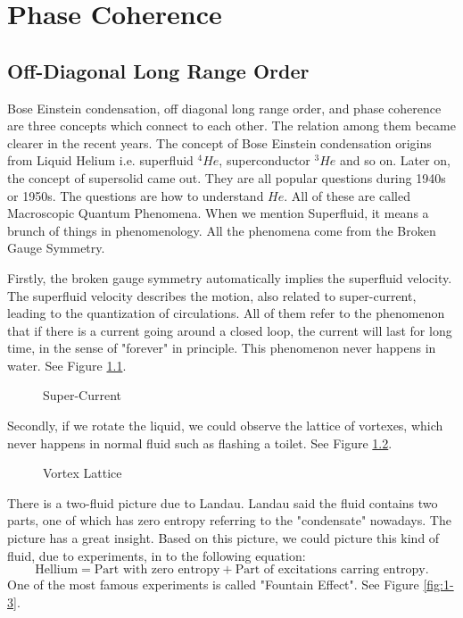 

\chapter{Phase Coherence}
\section{Off-Diagonal Long Range Order}
Bose Einstein condensation, off diagonal long range order, and phase coherence are three concepts which connect to each other. The relation among them became clearer in the recent years.
The concept of Bose Einstein condensation origins from Liquid Helium i.e.  superfluid $^4He$, superconductor $^3He$ and so on. Later on, the concept of supersolid came out. 
They are all popular questions during 1940s or 1950s. The questions are how to understand $He$. All of these are called Macroscopic Quantum Phenomena. 
When we mention Superfluid, it means a brunch of things in phenomenology. All the phenomena come from the Broken Gauge Symmetry. 

Firstly, the broken gauge symmetry automatically implies the superfluid velocity. The superfluid velocity describes the motion, also related to super-current, leading to the quantization of circulations. All of them refer to the phenomenon that if there is a current going around a closed loop, the current will last for long time, in the sense of "forever" in principle. This phenomenon never happens in water. See Figure \ref{fig:1-1}.

\begin{figure}[htbp]
\centering
\caption{Super-Current}
\label{fig:1-1}
\end{figure}


Secondly, if we rotate the liquid, we could observe the lattice of vortexes, which never happens in normal fluid such as flashing a toilet. See Figure \ref{fig:1-2}.

\begin{figure}[htbp]
\centering
\caption{Vortex Lattice}
\label{fig:1-2}
\end{figure}


There is a two-fluid picture due to Landau. Landau said the fluid contains two parts, one of which has zero entropy referring to the "condensate" nowadays. The picture has a great insight. Based on this picture, we could picture this kind of fluid, due to experiments, in to the following equation:
\begin{equation}
\text{Hellium} = \text{Part with zero entropy} + \text{Part of excitations carring entropy}.
\end{equation}
One of the most famous experiments is called "Fountain Effect". See Figure \ref{fig:1-3}.

